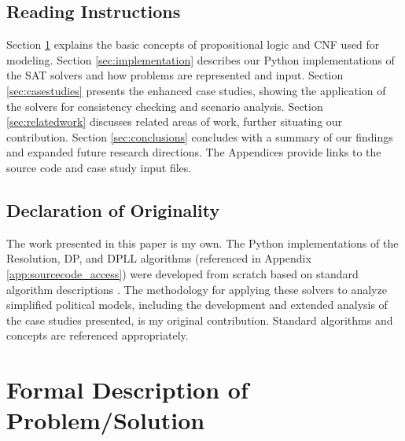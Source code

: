 \documentclass[11pt, a4paper]{article}
\begin{document}
\subsection*{Reading Instructions}
Section \ref{sec:formal} explains the basic concepts of propositional logic and CNF used for modeling. Section \ref{sec:implementation} describes our Python implementations of the SAT solvers and how problems are represented and input. Section \ref{sec:casestudies} presents the enhanced case studies, showing the application of the solvers for consistency checking and scenario analysis. Section \ref{sec:relatedwork} discusses related areas of work, further situating our contribution. Section \ref{sec:conclusions} concludes with a summary of our findings and expanded future research directions. The Appendices provide links to the source code and case study input files.
\subsection*{Declaration of Originality}
The work presented in this paper is my own. The Python implementations of the Resolution, DP, and DPLL algorithms (referenced in Appendix \ref{app:sourcecode_access}) were developed from scratch based on standard algorithm descriptions \cite{Robinson1965, DavisPutnam1960, DPLL1962}. The methodology for applying these solvers to analyze simplified political models, including the development and extended analysis of the case studies presented, is my original contribution. Standard algorithms and concepts are referenced appropriately.

\section{Formal Description of Problem/Solution} \label{sec:formal}
\end{document}
